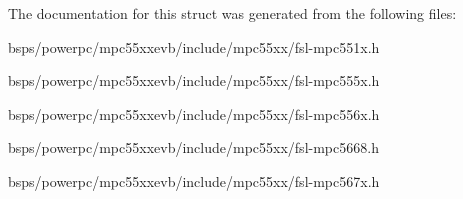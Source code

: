 The documentation for this struct was generated from the following files\+:\begin{DoxyCompactItemize}
\item 
bsps/powerpc/mpc55xxevb/include/mpc55xx/fsl-\/mpc551x.\+h\item 
bsps/powerpc/mpc55xxevb/include/mpc55xx/fsl-\/mpc555x.\+h\item 
bsps/powerpc/mpc55xxevb/include/mpc55xx/fsl-\/mpc556x.\+h\item 
bsps/powerpc/mpc55xxevb/include/mpc55xx/fsl-\/mpc5668.\+h\item 
bsps/powerpc/mpc55xxevb/include/mpc55xx/fsl-\/mpc567x.\+h\end{DoxyCompactItemize}
